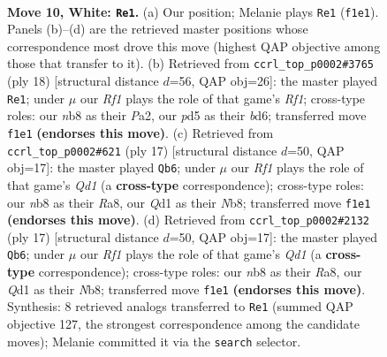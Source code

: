 \documentclass[11pt]{article}
\begin{document}
\clearpage

\begin{figure}[p]\centering
\begin{subfigure}{0.46\textwidth}\centering
\resizebox{\linewidth}{!}{%
\newchessgame
\chessboard[
  setfen={rnbqk2r/p5p1/2pb1n2/1p1p1p1p/3P4/4BNP1/PP2PPBP/RN1Q1RK1 w kq - 0 10},
  showmover=false,
  pgfstyle=straightmove, color=movearrow, markmove={f1-e1}
]}
\caption{}
\end{subfigure}\hfill
\begin{subfigure}{0.46\textwidth}\centering
\resizebox{\linewidth}{!}{%
\newchessgame
\chessboard[
  setfen={r2qk2r/pp3ppp/2pbpn2/5b2/2BP4/2P2N2/PP3PPP/R1BQ1RK1 w kq - 2 10},
  showmover=false,
  pgfstyle=straightmove, color=movearrow, markmove={f1-e1}
]}
\caption{}
\end{subfigure}
\\[4pt]
\begin{subfigure}{0.46\textwidth}\centering
\resizebox{\linewidth}{!}{%
\newchessgame
\chessboard[
  setfen={rn1q1rk1/pb1pbppp/4pn2/2p5/2P2B2/2NBPN1P/PP3PP1/R2QK2R b KQ - 3 9},
  showmover=false,
  pgfstyle=straightmove, color=movearrow, markmove={d8-b6}
]}
\caption{}
\end{subfigure}\hfill
\begin{subfigure}{0.46\textwidth}\centering
\resizebox{\linewidth}{!}{%
\newchessgame
\chessboard[
  setfen={rn1q1rk1/pb1pbppp/4pn2/2p5/2P2B2/2NBPN1P/PP3PP1/R2QK2R b KQ - 3 9},
  showmover=false,
  pgfstyle=straightmove, color=movearrow, markmove={d8-b6}
]}
\caption{}
\end{subfigure}
\caption{\textbf{Move 10, White: \texttt{Re1}.} (a) Our position; Melanie plays \texttt{Re1} (\texttt{f1e1}). Panels (b)--(d) are the retrieved master positions whose correspondence most drove this move (highest QAP objective among those that transfer to it). (b) Retrieved from \texttt{ccrl\_top\_p0002\#3765} (ply 18) [structural distance $d$=56, QAP obj=26]: the master played \texttt{Re1}; under $\mu$ our \emph{Rf1} plays the role of that game's \emph{Rf1}; cross-type roles: our \emph{n}b8 as their \emph{P}a2, our \emph{p}d5 as their \emph{b}d6; transferred move \texttt{f1e1} \textbf{(endorses this move)}. (c) Retrieved from \texttt{ccrl\_top\_p0002\#621} (ply 17) [structural distance $d$=50, QAP obj=17]: the master played \texttt{Qb6}; under $\mu$ our \emph{Rf1} plays the role of that game's \emph{Qd1} (a \textbf{cross-type} correspondence); cross-type roles: our \emph{n}b8 as their \emph{R}a8, our \emph{Q}d1 as their \emph{N}b8; transferred move \texttt{f1e1} \textbf{(endorses this move)}. (d) Retrieved from \texttt{ccrl\_top\_p0002\#2132} (ply 17) [structural distance $d$=50, QAP obj=17]: the master played \texttt{Qb6}; under $\mu$ our \emph{Rf1} plays the role of that game's \emph{Qd1} (a \textbf{cross-type} correspondence); cross-type roles: our \emph{n}b8 as their \emph{R}a8, our \emph{Q}d1 as their \emph{N}b8; transferred move \texttt{f1e1} \textbf{(endorses this move)}. Synthesis: 8 retrieved analogs transferred to \texttt{Re1} (summed QAP objective 127, the strongest correspondence among the candidate moves); Melanie committed it via the \texttt{search} selector.}
\label{fig:thought-m18}
\end{figure}
\end{document}
